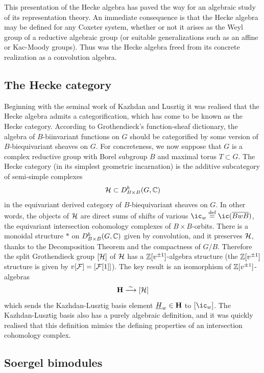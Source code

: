 This presentation of the Hecke algebra has paved the way for an algebraic study of its representation theory. An immediate consequence is that the Hecke algebra may be defined for any
Coxeter system, whether or not it arises as the Weyl group of a reductive algebraic group (or suitable generalizations such as an affine or Kac-Moody groups). Thus was the Hecke algebra
freed from its concrete realization as a convolution algebra.

\subsection{The Hecke category}

Beginning with the seminal work \cite{KaL1} of Kazhdan and Lusztig it was realised that the Hecke algebra admits a categorification, which has come to be known as the Hecke category. 
 According to Grothendieck's function-sheaf dictionary, the algebra of $B$-biinvariant functions on $G$ should be categorified by some version of $B$-biequivariant sheaves on $G$. For concreteness, we now suppose that $G$ is a complex reductive group with Borel subgroup $B$ and maximal torus $T \subset G$. The Hecke category (in its simplest geometric incarnation) is the additive subcategory of semi-simple complexes
\[
{\mathcal{H}} \subset D^b_{B \times B}(G, {\mathbb{C}})
\]
in the equivariant derived category of $B$-biequivariant sheaves on $G$. In other words, the objects of ${\mathcal{H}}$ are direct sums of shifts of various $\ic_w \define \ic(\overline{BwB})$, the equivariant intersection cohomology complexes of $B \times B$-orbits. There is a monoidal structure $*$ on $D^b_{B \times B}(G,{\mathbb{C}})$ given by convolution, and it preserves ${\mathcal{H}}$, thanks to the Decomposition Theorem and the compactness of $G/B$. Therefore the split Grothendieck group $[{\mathcal{H}}]$ of ${\mathcal{H}}$ has a ${\mathbb{Z}}[v^{\pm 1}]$-algebra structure (the ${\mathbb{Z}}[v^{\pm 1}]$ structure is given by $v[{\mathcal{F}}] = [{\mathcal{F}}[1]]$). The key result is an isomorphism of ${\mathbb{Z}}[v^{\pm 1}]$-algebras
\[
{\mathbf H} \stackrel{\sim}{\longrightarrow} [{\mathcal{H}}]
\]
which sends the Kazhdan-Lusztig basis element $\underline{H}_w \in {\mathbf H}$ to $[\ic_w]$. The Kazhdan-Lusztig basis also has a purely algebraic definition, and it was quickly realised that this definition mimics the defining properties of an intersection cohomology complex.

\subsection{Soergel bimodules}

